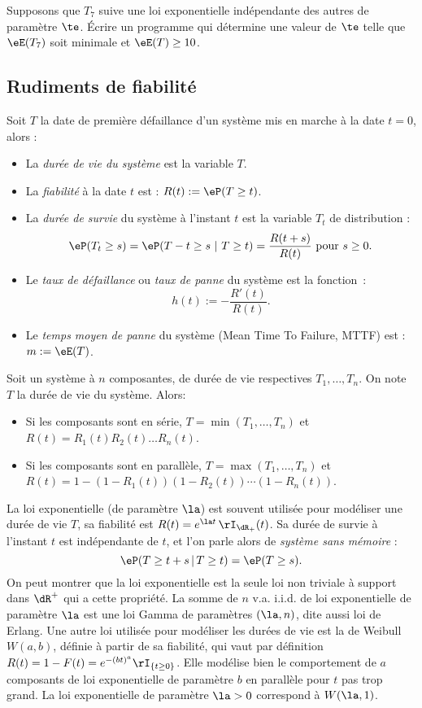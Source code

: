 \begin{exo}
  Supposons que $T_7$ suive une loi exponentielle indépendante des autres de
  paramètre $\te$. Écrire un programme \ML{} qui détermine une valeur de $\te$
  telle que $\eE(T_7)$ soit minimale et $\eE(T) \geq 10$.
\end{exo}

%
\subsection{Rudiments de fiabilité}
%

Soit $T$ la date de première défaillance d'un système mis en marche à
la date $t=0$, alors :
\begin{itemize}
\item La \emph{durée de vie du système} est la variable $T$.
\item La \emph{fiabilité} à la date $t$ est : $R(t):=\eP(T \geq t)$.
\item La \emph{durée de survie} du système à l'instant $t$ est la
  variable $T_t$ de distribution :
  $$
  \eP(T_t \geq s) =\eP(T-t\geq s\ |\ T\geq t) =\frac{R(t+s)}{R(t)}
  \text{ pour } s \geq 0.
  $$
\item Le \emph{taux de défaillance} ou \emph{taux de panne} du système
  est la fonction~: $$h(t):=-\frac{R'(t)}{R(t)}.$$
\item Le \emph{temps moyen de panne} du système (Mean Time To Failure,
  MTTF) est : $m:=\eE(T)$.
\end{itemize}

Soit un système à $n$ composantes, de durée de vie respectives
$T_1,\ldots,T_n$. On note $T$ la durée de vie du système. Alors:
\begin{itemize}
\item Si les composants sont en série, $T=\min(T_1,\ldots,T_n)$ et
  $R(t)=R_1(t)R_2(t)\ldots R_n(t)$.
\item Si les composants sont en parallèle, $T=\max(T_1,\ldots,T_n)$ et
  $R(t)=1-(1-R_1(t))(1-R_2(t))\cdots(1-R_n(t))$.
\end{itemize}

La loi exponentielle (de paramètre $\la$) est souvent utilisée pour
modéliser une durée de vie $T$, sa fiabilité est $R(t)=e^{\la
  t}\,\rI_{\dR_+}(t)$. Sa durée de survie à l'instant $t$ est
indépendante de $t$, et l'on parle alors de \emph{système sans
  mémoire} :
$$
\eP(T \geq t+s\,|\,T\geq t)=\eP(T \geq s).
$$
On peut montrer que la loi exponentielle est la seule loi non
triviale à support dans $\dR^+$ qui a cette propriété.  La somme de
$n$ v.a. i.i.d. de loi exponentielle de paramètre $\la$ est une loi
Gamma de paramètres $(\la,n)$, dite aussi loi de Erlang. Une autre loi
utilisée pour modéliser les durées de vie est la de Weibull $W(a,b)$,
définie à partir de sa fiabilité, qui vaut par définition
$R(t)=1-F(t)=e^{-(bt)^a}\rI_{\{t \geq 0\}}$. Elle modélise bien le
comportement de $a$ composants de loi exponentielle de paramètre $b$
en parallèle pour $t$ pas trop grand.  La loi exponentielle de
paramètre $\la>0$ correspond à $W(\la,1)$.

